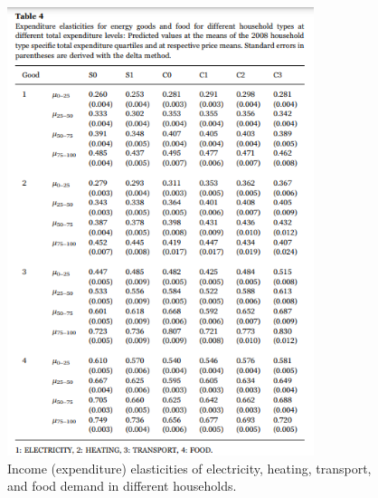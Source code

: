 \begin{figure}[h]  %
	\centering
	\includegraphics[width=0.8\textwidth]{./figure/ch2/fig2.4_table4.png}
	\caption{Income (expenditure) elasticities of electricity, heating, transport, and food demand in different households.}\label{fig2.4}
\end{figure}

